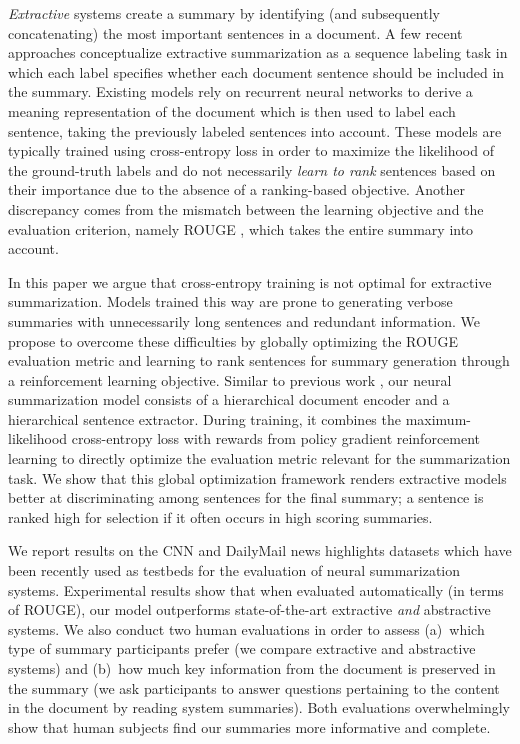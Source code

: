 \documentclass[11pt,a4paper]{article}
\begin{document}
\emph{Extractive} systems create a summary by identifying (and
subsequently concatenating) the most important sentences in a
document. A few recent approaches
\cite{jp-acl16,nallapati17,narayan-arxiv17,Yasunaga:2017:gcn}
conceptualize extractive summarization as a sequence labeling task in
which each label specifies whether each document sentence should be
included in the summary. Existing models rely on recurrent neural
networks to derive a meaning representation of the document which is
then used to label each sentence, taking the previously labeled
sentences into account. These models are typically trained using
cross-entropy loss in order to maximize the likelihood of the
ground-truth labels and do not necessarily \emph{learn to rank}
sentences based on their importance due to the absence of a
ranking-based objective. Another discrepancy comes from the mismatch
between the learning objective and the evaluation criterion, namely
ROUGE \cite{rouge}, which takes the entire summary into account.


In this paper we argue that cross-entropy training is not optimal for
extractive summarization. Models trained this way are prone to
generating verbose summaries with unnecessarily long sentences and
redundant information.  We propose to overcome these difficulties by
globally optimizing the ROUGE evaluation metric and learning to rank
sentences for summary generation through a reinforcement learning
objective. Similar to previous work
\cite{jp-acl16,narayan-arxiv17,nallapati17}, our neural summarization
model consists of a hierarchical document encoder and a hierarchical
sentence extractor. During training, it combines the
maximum-likelihood cross-entropy loss with rewards from policy
gradient reinforcement learning to directly optimize the evaluation
metric relevant for the summarization task. We show that this global
optimization framework renders extractive models better at
discriminating among sentences for the final summary; a sentence is
ranked high for selection if it often occurs in high scoring
summaries.

 
We report results on the CNN and DailyMail news highlights datasets
\cite{hermann-nips15} which have been recently used as testbeds for
the evaluation of neural summarization systems. Experimental results
show that when evaluated automatically (in terms of ROUGE), our model
outperforms state-of-the-art extractive \emph{and} abstractive
systems. We also conduct two human evaluations in order to assess
(a)~which type of summary participants prefer (we compare extractive
and abstractive systems) and (b)~how much key information from the
document is preserved in the summary (we ask participants to answer
questions pertaining to the content in the document by reading system
summaries). Both evaluations overwhelmingly show that human subjects
find our summaries more informative and complete.
\end{document}
